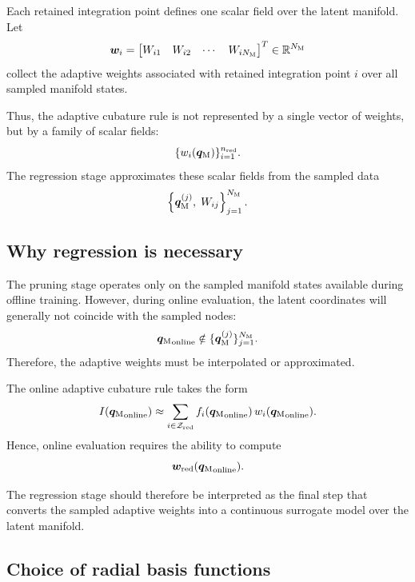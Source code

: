 \documentclass[11pt,a4paper]{article}
\begin{document}
Each retained integration point defines one scalar field over the latent
manifold. Let
\[
        \bm w_i
        =
        \begin{bmatrix}
        W_{i1} &
        W_{i2} &
        \cdots &
        W_{iN_{\mathrm{M}}}
        \end{bmatrix}^T
        \in\mathbb{R}^{N_{\mathrm{M}}}
\]
collect the adaptive weights associated with retained integration point $i$
over all sampled manifold states.

Thus, the adaptive cubature rule is not represented by a single vector of
weights, but by a family of scalar fields:
\[
        \{
        w_i(\bm q_{\mathrm{M}})
        \}_{i=1}^{n_{\mathrm{red}}}.
\]
The regression stage approximates these scalar fields from the sampled data
\[
        \left\{
        \bm q_{\mathrm{M}}^{(j)},
        \;
        W_{ij}
        \right\}_{j=1}^{N_{\mathrm{M}}}.
\]

\subsection{Why regression is necessary}

The pruning stage operates only on the sampled manifold states available during
offline training. However, during online evaluation, the latent coordinates
will generally not coincide with the sampled nodes:
\[
        {\bm q_{\mathrm{M}}}_{\mathrm{online}}
        \notin
        \{
        \bm q_{\mathrm{M}}^{(j)}
        \}_{j=1}^{N_{\mathrm{M}}}.
\]
Therefore, the adaptive weights must be interpolated or approximated.

The online adaptive cubature rule takes the form
\[
        I({\bm q_{\mathrm{M}}}_{\mathrm{online}})
        \approx
        \sum_{i\in\mathcal{Z}_{\mathrm{red}}}
        f_i({\bm q_{\mathrm{M}}}_{\mathrm{online}})
        \,
        w_i({\bm q_{\mathrm{M}}}_{\mathrm{online}}).
\]
Hence, online evaluation requires the ability to compute
\[
        \bm w_{\mathrm{red}}({\bm q_{\mathrm{M}}}_{\mathrm{online}}).
\]

The regression stage should therefore be interpreted as the final step that
converts the sampled adaptive weights into a continuous surrogate model over
the latent manifold.

\subsection{Choice of radial basis functions}
\end{document}
